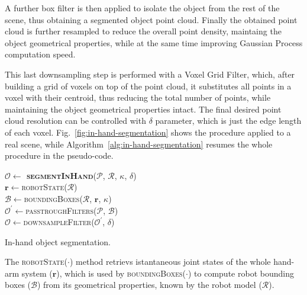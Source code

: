 A further box filter is then applied to isolate the object from the rest of the scene,
thus obtaining a segmented object point cloud. 
Finally the obtained point cloud is further resampled to reduce the overall point
density, maintaing the object geometrical properties, while at the same time
improving Gaussian Process computation speed. 

This last downsampling step is performed with a Voxel Grid Filter, which, after
building a grid of voxels on top of the point cloud, it
substitutes all points in a voxel with their centroid, thus reducing the total number of 
points, while maintaining the object geometrical properties intact. The final desired
point cloud resolution can be controlled with $\delta$ parameter, which is just the edge length of each voxel.
Fig.~\ref{fig:in-hand-segmentation} shows the procedure applied to a real scene,
while  Algorithm~\ref{alg:in-hand-segmentation} resumes  the whole  procedure in
the pseudo-code.

\begin{algorithm}[h]
    \textbf{$\mathcal{O} \leftarrow$ \textsc{segmentInHand}}($\mathcal{P}$, $\mathcal{R}$, $\kappa$, $\delta$)\\ %
\LinesNumbered
\DontPrintSemicolon
\SetAlgoVlined {} 
  $\mathbf{r} \leftarrow$\textsc{robotState}($\mathcal{R}$) \\
  $\mathcal{B} \leftarrow$\textsc{boundingBoxes}($\mathcal{R}$, $\mathbf{r}$, $\kappa$) \\
  $\mathcal{O^\prime} \leftarrow$\textsc{passtroughFilters}($\mathcal{P}$, $\mathcal{B}$) \\
  $\mathcal{O} \leftarrow$\textsc{downsampleFilter}($\mathcal{O^\prime}$, $\delta$) \\
\caption{In-hand object segmentation.} \label{alg:in-hand-segmentation}
\end{algorithm}

The \textsc{robotState}($\cdot$) method retrievs istantaneous joint states
of the whole hand-arm system ($\mathbf{r}$), which is used by \textsc{boundingBoxes($\cdot$)} to compute robot bounding boxes ($\mathcal{B}$)
from its geometrical properties, known by the robot model ($\mathcal{R}$).

